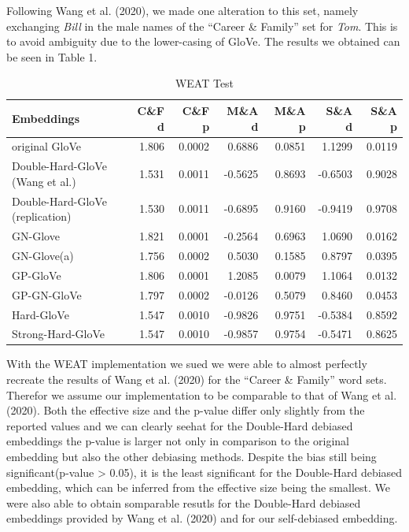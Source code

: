 \documentclass[
  english,
  man,floatsintext]{apa6}
\begin{document}
Following Wang et al. (2020), we made one alteration to this set, namely exchanging \emph{Bill} in the male names of the ``Career \& Family'' set for \emph{Tom}. This is to avoid ambiguity due to the lower-casing of GloVe. The results we obtained can be seen in Table 1.

\begin{table}

\caption{\label{tab:unnamed-chunk-1}WEAT Test}
\centering
\begin{tabular}[t]{l|r|r|r|r|r|r}
\hline
Embeddings & C\&F d & C\&F p & M\&A d & M\&A p & S\&A d & S\&A p\\
\hline
original GloVe & 1.806 & 0.0002 & 0.6886 & 0.0851 & 1.1299 & 0.0119\\
\hline
Double-Hard-GloVe (Wang et al.) & 1.531 & 0.0011 & -0.5625 & 0.8693 & -0.6503 & 0.9028\\
\hline
Double-Hard-GloVe (replication) & 1.530 & 0.0011 & -0.6895 & 0.9160 & -0.9419 & 0.9708\\
\hline
GN-Glove & 1.821 & 0.0001 & -0.2564 & 0.6963 & 1.0690 & 0.0162\\
\hline
GN-Glove(a) & 1.756 & 0.0002 & 0.5030 & 0.1585 & 0.8797 & 0.0395\\
\hline
GP-GloVe & 1.806 & 0.0001 & 1.2085 & 0.0079 & 1.1064 & 0.0132\\
\hline
GP-GN-GloVe & 1.797 & 0.0002 & -0.0126 & 0.5079 & 0.8460 & 0.0453\\
\hline
Hard-GloVe & 1.547 & 0.0010 & -0.9826 & 0.9751 & -0.5384 & 0.8592\\
\hline
Strong-Hard-GloVe & 1.547 & 0.0010 & -0.9857 & 0.9754 & -0.5471 & 0.8625\\
\hline
\end{tabular}
\end{table}

With the WEAT implementation we sued we were able to almost perfectly recreate the results of Wang et al. (2020) for the ``Career \& Family'' word sets. Therefor we assume our implementation to be comparable to that of Wang et al. (2020). Both the effective size and the p-value differ only slightly from the reported values and we can clearly seehat for the Double-Hard debiased embeddings the p-value is larger not only in comparison to the original embedding but also the other debiasing methods. Despite the bias still being significant(p-value \textgreater{} 0.05), it is the least significant for the Double-Hard debiased embedding, which can be inferred from the effective size being the smallest. We were also able to obtain somparable resutls for the Double-Hard debiased embeddings provided by Wang et al. (2020) and for our self-debiased embedding.
\end{document}
